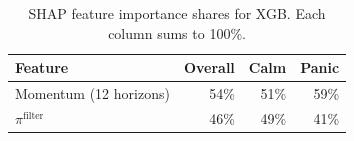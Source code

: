 \begin{table}[htbp]
\centering
\begin{tabular}{l r r r}
\toprule
Feature & Overall & Calm & Panic \\
\midrule
Momentum (12 horizons) & 54\% & 51\% & 59\% \\
$\pi^{\text{filter}}$ & 46\% & 49\% & 41\% \\
\bottomrule
\end{tabular}
\caption{SHAP feature importance shares for XGB. Each column sums to 100\%.}
\label{tab:shap}
\end{table}
